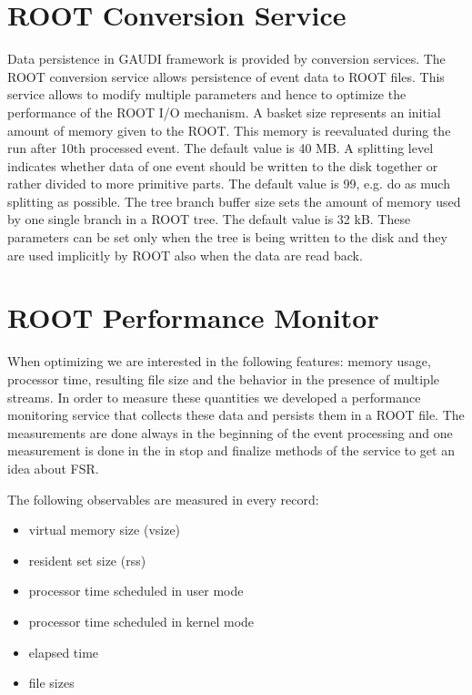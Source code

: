 \documentclass[pdftex,a4paper]{article}
\begin{document}
\section{ROOT Conversion Service}
\label{sec:cnvsvc}
Data persistence in GAUDI framework is provided by conversion services. The ROOT conversion service allows persistence of event data to ROOT files. This service allows to modify multiple parameters and hence to optimize the performance of the ROOT I/O mechanism. A basket size represents an initial amount of memory given to the ROOT. This memory is reevaluated during the run after 10th processed event. The default value is 40 MB. A splitting level indicates whether data of one event should be written to the disk together or rather divided to more primitive parts. The default value is 99, e.g. do as much splitting as possible. The tree branch buffer size sets the amount of memory used by one single branch in a ROOT tree. The default value is 32 kB. These parameters can be set only when the tree is being written to the disk and they are used implicitly by ROOT also when the data are read back.

\section{ROOT Performance Monitor}
\label{sec:perfmon}
When optimizing we are interested in the following features: memory usage, processor time, resulting file size and the behavior in the presence of multiple streams. In order to measure these quantities we developed a performance monitoring service that collects these data and persists them in a ROOT file. The measurements are done always in the beginning of the event processing and one measurement is done in the in stop and finalize methods of the service to get an idea about FSR.

The following observables are measured in every record:
\begin{multicols}{2}
\begin{itemize}
  \item virtual memory size (vsize)
  \item resident set size (rss)
  \item processor time scheduled in user mode
  \item processor time scheduled in kernel mode
  \item elapsed time
  \item file sizes
\end{itemize}
\end{multicols}
\end{document}
